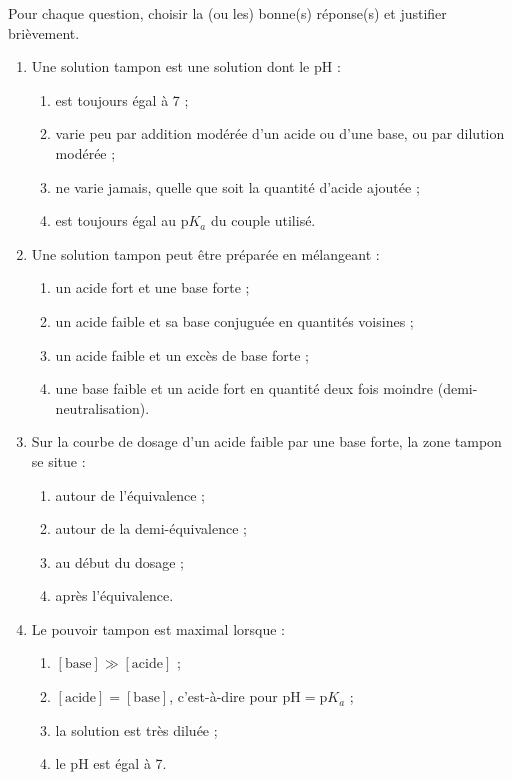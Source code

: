 \documentclass[11pt]{article}
\begin{document}
\begin{exercice}
Pour chaque question, choisir la (ou les) bonne(s) réponse(s) et justifier brièvement.
\begin{enumerate}
  \item Une solution tampon est une solution dont le pH :
  \begin{enumerate}
    \item est toujours égal à 7 ;
    \item varie peu par addition modérée d'un acide ou d'une base, ou par dilution modérée ;
    \item ne varie jamais, quelle que soit la quantité d'acide ajoutée ;
    \item est toujours égal au $\mathrm{p}K_a$ du couple utilisé.
  \end{enumerate}
  \item Une solution tampon peut être préparée en mélangeant :
  \begin{enumerate}
    \item un acide fort et une base forte ;
    \item un acide faible et sa base conjuguée en quantités voisines ;
    \item un acide faible et un excès de base forte ;
    \item une base faible et un acide fort en quantité deux fois moindre (demi-neutralisation).
  \end{enumerate}
  \item Sur la courbe de dosage d'un acide faible par une base forte, la zone tampon se situe :
  \begin{enumerate}
    \item autour de l'équivalence ;
    \item autour de la demi-équivalence ;
    \item au début du dosage ;
    \item après l'équivalence.
  \end{enumerate}
  \item Le pouvoir tampon est maximal lorsque :
  \begin{enumerate}
    \item $[\text{base}] \gg [\text{acide}]$ ;
    \item $[\text{acide}] = [\text{base}]$, c'est-à-dire pour $\mathrm{pH} = \mathrm{p}K_a$ ;
    \item la solution est très diluée ;
    \item le pH est égal à 7.
  \end{enumerate}
\end{enumerate}
\end{exercice}
\end{document}
